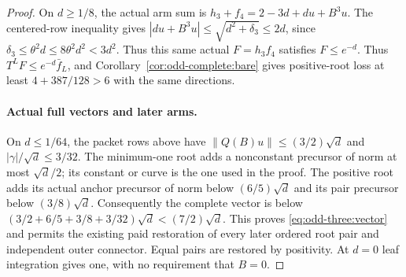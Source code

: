 \begin{proof}
On $d\ge1/8$, the actual arm sum is
$h_3+f_4=2-3d+du+B^3u$.
The centered-row inequality gives
$|du+B^3u|\le\sqrt{d^2+\delta_3}\le2d$, since
$\delta_3\le\theta^2d\le8\theta^2d^2<3d^2$.
Thus this same actual $F=h_3f_4$ satisfies $F\le e^{-d}$.
Thus $T^LF\le e^{-d}\bar f_L$, and
Corollary~\ref{cor:odd-complete:bare} gives positive-root loss at
least $4+387/128>6$ with the same directions.

\paragraph{Actual full vectors and later arms.}
On $d\le1/64$, the packet rows above have
$\|Q(B)u\|\le(3/2)\sqrt d$ and
$|\gamma|/\sqrt d\le3/32$.
The minimum-one root adds a nonconstant precursor of norm at most
$\sqrt d/2$; its constant or curve is the one used in the proof.
The positive root adds its actual anchor precursor of norm below
$(6/5)\sqrt d$ and its pair precursor below $(3/8)\sqrt d$.
Consequently the complete vector is below
$(3/2+6/5+3/8+3/32)\sqrt d<(7/2)\sqrt d$.
This proves \eqref{eq:odd-three:vector} and permits the existing
paid restoration of every later ordered root pair and independent
outer connector. Equal pairs are restored by positivity.
At $d=0$ leaf integration gives one, with no requirement that $B=0$.
\end{proof}
